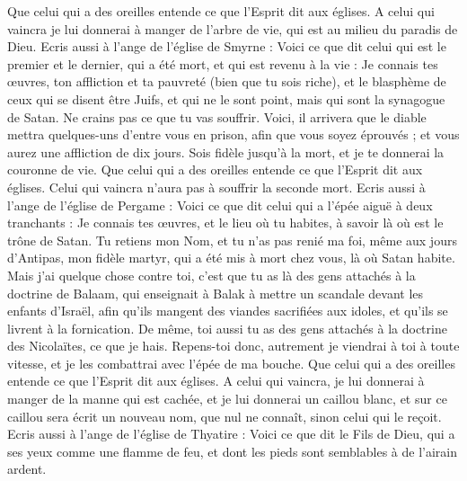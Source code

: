 \begin{multicols}{2}
Que celui qui a des oreilles entende ce que l'Esprit dit aux églises. A celui qui vaincra je lui donnerai à manger de l'arbre de vie, qui est au milieu du paradis de Dieu.
Ecris aussi à l'ange de l'église de Smyrne : Voici ce que dit celui qui est le premier et le dernier, qui a été mort, et qui est revenu à la vie :
Je connais tes œuvres, ton affliction et ta pauvreté (bien que tu sois riche), et le blasphème de ceux qui se disent être Juifs, et qui ne le sont point, mais qui sont la synagogue de Satan.
Ne crains pas ce que tu vas souffrir. Voici, il arrivera que le diable mettra quelques-uns d’entre vous en prison, afin que vous soyez éprouvés ; et vous aurez une affliction de dix jours. Sois fidèle jusqu’à la mort, et je te donnerai la couronne de vie.
Que celui qui a des oreilles entende ce que l'Esprit dit aux églises. Celui qui vaincra n’aura pas à souffrir la seconde mort.
Ecris aussi à l'ange de l'église de Pergame : Voici ce que dit celui qui a l'épée aiguë à deux tranchants{} : 
Je connais tes œuvres, et le lieu où tu habites, à savoir là où est le trône de Satan. Tu retiens mon Nom, et tu n'as pas renié ma foi, même aux jours d’Antipas, mon fidèle martyr{}, qui a été mis à mort chez vous, là où Satan habite.
Mais j'ai quelque chose contre toi, c'est que tu as là des gens attachés à la doctrine de Balaam, qui enseignait à Balak à mettre un scandale devant les enfants d'Israël, afin qu'ils mangent des viandes sacrifiées aux idoles, et qu'ils se livrent à la fornication{}.
De même, toi aussi tu as des gens attachés à la doctrine des Nicolaïtes, ce que je hais.
Repens-toi donc, autrement je viendrai à toi à toute vitesse, et je les combattrai avec l'épée de ma bouche.
Que celui qui a des oreilles entende ce que l'Esprit dit aux églises. A celui qui vaincra, je lui donnerai à manger de la manne qui est cachée, et je lui donnerai un caillou blanc, et sur ce caillou sera écrit un nouveau nom, que nul ne connaît, sinon celui qui le reçoit.
Ecris aussi à l'ange de l'église de Thyatire : Voici ce que dit le Fils de Dieu, qui a ses yeux comme une flamme de feu, et dont les pieds sont semblables à de l'airain ardent.

\end{multicols}
